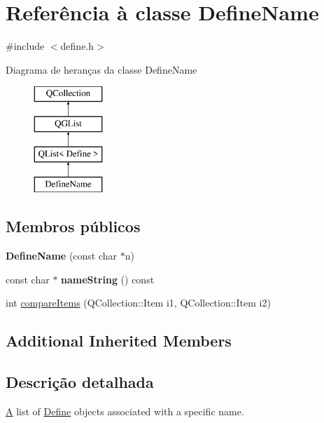 \hypertarget{class_define_name}{\section{Referência à classe Define\-Name}
\label{class_define_name}
}


{\ttfamily \#include $<$define.\-h$>$}

Diagrama de heranças da classe Define\-Name\begin{figure}[H]
\begin{center}
\leavevmode
\includegraphics[height=4.000000cm]{class_define_name}
\end{center}
\end{figure}
\subsection*{Membros públicos}
\begin{DoxyCompactItemize}
\item 
\hypertarget{class_define_name_a7130a8c2ca86cb0c37ec05a3f51c43dc}{{\bfseries Define\-Name} (const char $\ast$n)}\label{class_define_name_a7130a8c2ca86cb0c37ec05a3f51c43dc}

\item 
\hypertarget{class_define_name_a16b954faad2e6bfbc2cb78724023a6e2}{const char $\ast$ {\bfseries name\-String} () const }\label{class_define_name_a16b954faad2e6bfbc2cb78724023a6e2}

\item 
int \hyperlink{class_define_name_a44ca4833fab8a8d30ea70614e7d47753}{compare\-Items} (Q\-Collection\-::\-Item i1, Q\-Collection\-::\-Item i2)
\end{DoxyCompactItemize}
\subsection*{Additional Inherited Members}


\subsection{Descrição detalhada}
\hyperlink{class_a}{A} list of \hyperlink{class_define}{Define} objects associated with a specific name. 

